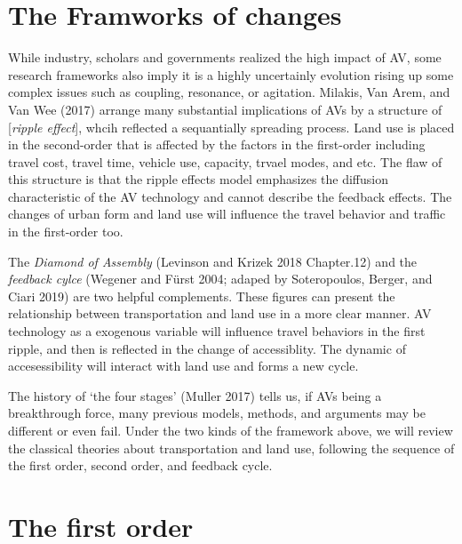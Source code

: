 \documentclass[12pt,]{article}
\begin{document}
\hypertarget{the-framworks-of-changes}{%
\section{The Framworks of changes}\label{the-framworks-of-changes}}

While industry, scholars and governments realized the high impact of AV,
some research frameworks also imply it is a highly uncertainly evolution
rising up some complex issues such as coupling, resonance, or agitation.
Milakis, Van Arem, and Van Wee (2017) arrange many substantial
implications of AVs by a structure of {[}\emph{ripple effect}{]}, whcih
reflected a sequantially spreading process. Land use is placed in the
second-order that is affected by the factors in the first-order
including travel cost, travel time, vehicle use, capacity, trvael modes,
and etc. The flaw of this structure is that the ripple effects model
emphasizes the diffusion characteristic of the AV technology and cannot
describe the feedback effects. The changes of urban form and land use
will influence the travel behavior and traffic in the first-order too.

The \emph{Diamond of Assembly} (Levinson and Krizek 2018 Chapter.12) and
the \emph{feedback cylce} (Wegener and Fürst 2004; adaped by
Soteropoulos, Berger, and Ciari 2019) are two helpful complements. These
figures can present the relationship between transportation and land use
in a more clear manner. AV technology as a exogenous variable will
influence travel behaviors in the first ripple, and then is reflected in
the change of accessiblity. The dynamic of accesessibility will interact
with land use and forms a new cycle.

The history of `the four stages' (Muller 2017) tells us, if AVs being a
breakthrough force, many previous models, methods, and arguments may be
different or even fail. Under the two kinds of the framework above, we
will review the classical theories about transportation and land use,
following the sequence of the first order, second order, and feedback
cycle.

\hypertarget{the-first-order}{%
\section{The first order}\label{the-first-order}}
\end{document}
